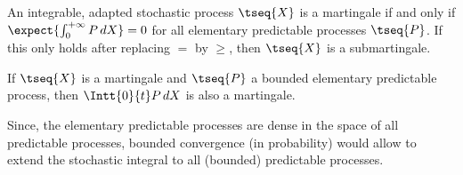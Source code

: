     \begin{property}
        An integrable, adapted stochastic process $\tseq{X}$ is a martingale if and only if $\expect{\int_0^{+\infty}P\,dX}=0$ for all elementary predictable processes $\tseq{P}$. If this only holds after replacing $=$ by $\geq$, then $\tseq{X}$ is a submartingale.
    \end{property}

    \begin{property}
        If $\tseq{X}$ is a martingale and $\tseq{P}$ a bounded elementary predictable process, then $\Intt{0}{t}P\,dX$ is also a martingale.
    \end{property}

    Since, the elementary predictable processes are dense in the space of all predictable processes, bounded convergence (in probability) would allow to extend the stochastic integral to all (bounded) predictable processes.

